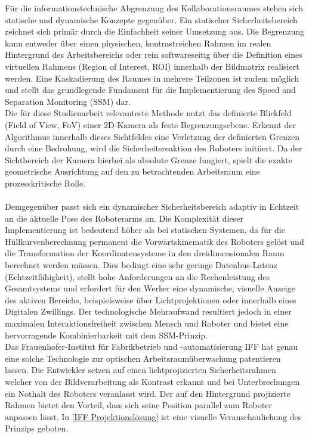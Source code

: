 Für die informationstechnische Abgrenzung des Kollaborationsraumes stehen sich statische und dynamische Konzepte gegenüber. Ein statischer Sicherheitsbereich zeichnet sich primär durch die Einfachheit seiner Umsetzung aus. Die Begrenzung kann entweder über einen physischen, kontrastreichen Rahmen im realen Hintergrund des Arbeitsbereichs oder rein softwareseitig über die Definition eines virtuellen Rahmens (Region of Interest, ROI) innerhalb der Bildmatrix realisiert werden. Eine Kaskadierung des Raumes in mehrere Teilzonen ist zudem möglich und stellt das grundlegende Fundament für die Implementierung des Speed and Separation Monitoring (SSM) dar. 
\\Die für diese Studienarbeit relevanteste Methode nutzt das definierte Blickfeld (Field of View, FoV) einer 2D-Kamera als feste Begrenzungsebene. Erkennt der Algorithmus innerhalb dieses Sichtfeldes eine Verletzung der definierten Grenzen durch eine Bedrohung, wird die Sicherheitsreaktion des Roboters initiiert. Da der Sichtbereich der Kamera hierbei als absolute Grenze fungiert, spielt die exakte geometrische Ausrichtung auf den zu betrachtenden Arbeitsraum eine prozesskritische Rolle.
\\
\\Demgegenüber passt sich ein dynamischer Sicherheitsbereich adaptiv in Echtzeit an die aktuelle Pose des Roboterarms an. Die Komplexität dieser Implementierung ist bedeutend höher als bei statischen Systemen, da für die Hüllkurvenberechnung permanent die Vorwärtskinematik des Roboters gelöst und die Transformation der Koordinatensysteme in den dreidimensionalen Raum berechnet werden müssen. Dies bedingt eine sehr geringe Datenbus-Latenz (Echtzeitfähigkeit), stellt hohe Anforderungen an die Rechenleistung des Gesamtsystems und erfordert für den Werker eine dynamische, visuelle Anzeige des aktiven Bereichs, beispielsweise über Lichtprojektionen oder innerhalb eines Digitalen Zwillings. Der technologische Mehraufwand resultiert jedoch in einer maximalen Interaktionsfreiheit zwischen Mensch und Roboter und bietet eine hervorragende Kombinierbarkeit mit dem SSM-Prinzip.
\\
Das Frauenhofer-Institut für Fabrikbetrieb und -automatisierung IFF hat genau eine solche Technologie zur optischen Arbeitsraumüberwachung patentieren lassen. Die Entwickler setzen auf einen lichtprojizierten Sicherheitsrahmen welcher von der Bildverarbeitung als Kontrast erkannt und bei Unterbrechungen ein Nothalt des Roboters veranlasst wird. Der auf den Hintergrund projizierte Rahmen bietet den Vorteil, dass sich seine Position parallel zum Roboter anpassen lässt. In \autoref{IFF Projektionslösung} ist eine visuelle Veranschaulichung des Prinzips geboten. 
